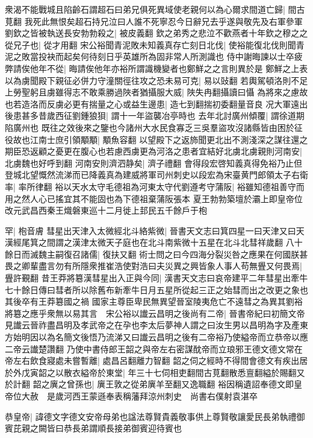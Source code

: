 衆渴不能戰城且陷齡石謂超石曰弟兄俱死異域使老親何以為心爾求間道亡歸|{
	間古莧翻}
我死此無恨矣超石持兄泣曰人誰不死寧忍今日辭兄去乎遂與敬先及右軍參軍劉欽之皆被執送長安勃勃殺之|{
	被皮義翻}
欽之弟秀之悲泣不歡燕者十年欽之穆之之從兄子也|{
	從才用翻}
宋公裕聞青泥敗未知義真存亡刻日北伐|{
	使裕能復北伐則聞青泥之敗當投袂而起矣何待刻日乎英雄所為固非常人所測識也}
侍中謝晦諫以士卒疲弊請俟他年不從|{
	晦請俟他年亦裕所謂識機變者也鄭鮮之之言則異於是}
鄭鮮之上表以為虜聞殿下親征必併力守潼關徑往攻之恐未易可克|{
	易以䜴翻}
若輿駕頓洛則不足上勞聖躬且虜雖得志不敢乘勝過陜者猶攝服大威|{
	陜失冉翻攝讀曰懾}
為將來之慮故也若造洛而反虜必更有揣量之心或益生邊患|{
	造七到翻揣初委翻量音良}
况大軍遠出後患甚多昔歲西征劉鍾狼狽|{
	謂十一年盜襲冶亭時也}
去年北討廣州傾覆|{
	謂徐道期陷廣州也}
既往之效後來之鑒也今諸州大水民食寡乏三吳羣盜攻沒諸縣皆由困於征役故也江南士庶引領顒顒|{
	顒魚容翻}
以望殿下之返斾聞更北出不測淺深之謀往還之期臣恐返顧之憂更在腹心也若慮西虜更為河洛之患者宜結好北虜北虜親則河南安|{
	北虜魏也好呼到翻}
河南安則濟泗静矣|{
	濟子禮翻}
會得段宏啓知義真得免裕乃止但登城北望慨然流涕而已降義真為建威將軍司州刺史以段宏為宋臺黄門郎領太子右衛率|{
	率所律翻}
裕以天水太守毛德祖為河東太守代劉遵考守蒲阪|{
	裕雖知德祖善守而用之然人心已搖宜其不能固也為下德祖棄蒲阪張本}
夏王勃勃築壇於灞上即皇帝位改元武昌西秦王熾磐東巡十二月徙上邽民五千餘戶于枹

罕|{
	枹音膚}
彗星出天津入太微經北斗絡紫微|{
	晉書天文志曰箕四星一曰天津又曰天漢經尾箕之間謂之漢津太微天子庭也在北斗南紫微十五星在北斗北彗祥歲翻}
八十餘日而滅魏主嗣復召諸儒|{
	復扶又翻}
術士問之曰今四海分裂災咎之應果在何國朕甚畏之卿輩盡言勿有所隱衆推崔浩使對浩曰夫災異之興皆象人事人苟無舋又何畏焉|{
	舋許覲翻}
昔王莽將簒漢彗星出入正與今同|{
	漢書天文志曰哀帝建平二年彗星出牽牛七十餘日傳曰彗者所以除舊布新牽牛日月五星所從起三正之始彗而出之改更之象也其後卒有王莽簒國之禍}
國家主尊臣卑民無異望晉室陵夷危亡不遠彗之為異其劉裕將簒之應乎衆無以易其言　宋公裕以䜟云昌明之後尚有二帝|{
	晉書帝紀曰初簡文帝見䜟云晉祚盡昌明及孝武帝之在孕也李太后夢神人謂之曰汝生男以昌明為字及產東方始明因以為名簡文後悟乃流涕又曰䜟云昌明之後有二帝裕乃使縊帝而立恭帝以應二帝云䜟楚讚翻}
乃使中書侍郎王韶之與帝左右密謀酖帝而立琅邪王德文德文常在帝左右飲食寢處未嘗暫離|{
	處昌呂翻離力智翻}
韶之伺之經時不得間會德文有疾出居於外戊寅韶之以散衣縊帝於東堂|{
	年三十七伺相吏翻間古莧翻散悉亶翻縊於賜翻又於計翻}
韶之廙之曾孫也|{
	廙王敦之從弟廙羊至翻又逸職翻}
裕因稱遺詔奉德文即皇帝位大赦　是歲河西王蒙遜奉表稱藩拜涼州刺史　尚書右僕射袁湛卒

恭皇帝|{
	諱德文字德文安帝母弟也諡法尊賢貴義敬事供上尊賢敬讓愛民長弟執禮御賓芘親之闕皆曰恭長弟謂順長接弟御賓迎待賓也}


